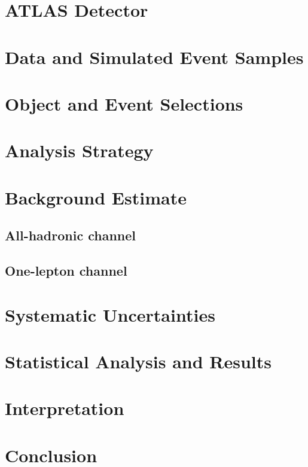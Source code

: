 \section{ATLAS Detector}

\section{Data and Simulated Event Samples}\label{sec:dark_meson_samples}

\section{Object and Event Selections}

\section{Analysis Strategy}

\section{Background Estimate}
\subsection{All-hadronic channel}

\subsection{One-lepton channel}\label{sec:bkg_onelep}

\section{Systematic Uncertainties}\label{sec:systematics}

\section{Statistical Analysis and Results}

\section{Interpretation}

\section{Conclusion}
\label{sec:dark_meson_conclusion}

